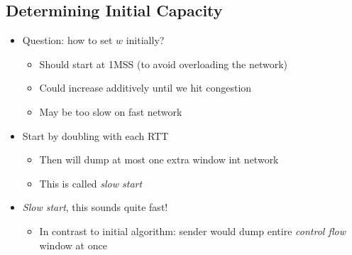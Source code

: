 \subsection{Determining Initial Capacity}
\begin{itemize}
    \item Question: how to set $w$ initially?
          \begin{itemize}
              \item Should start at 1MSS (to avoid overloading the network)
              \item Could increase additively until we hit congestion
              \item May be too slow on fast network
          \end{itemize}
    \item Start by doubling with each RTT
          \begin{itemize}
              \item Then will dump at most one extra window int network
              \item This is called \emph{slow start}
          \end{itemize}
    \item \emph{Slow start}, this sounds quite fast!
          \begin{itemize}
              \item In contrast to initial algorithm: sender would dump entire \emph{control flow} window at once
          \end{itemize}
\end{itemize}